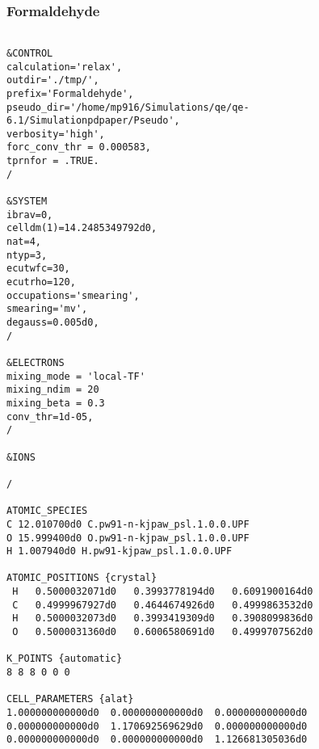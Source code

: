 \subsubsection*{Formaldehyde}
\begin{verbatim}
    
&CONTROL
calculation='relax',
outdir='./tmp/',
prefix='Formaldehyde',
pseudo_dir='/home/mp916/Simulations/qe/qe-6.1/Simulationpdpaper/Pseudo',
verbosity='high',
forc_conv_thr = 0.000583,
tprnfor = .TRUE.
/

&SYSTEM
ibrav=0,
celldm(1)=14.2485349792d0,
nat=4,
ntyp=3,
ecutwfc=30,
ecutrho=120,
occupations='smearing',
smearing='mv',
degauss=0.005d0,
/

&ELECTRONS
mixing_mode = 'local-TF'
mixing_ndim = 20
mixing_beta = 0.3
conv_thr=1d-05,
/

&IONS

/

ATOMIC_SPECIES
C 12.010700d0 C.pw91-n-kjpaw_psl.1.0.0.UPF
O 15.999400d0 O.pw91-n-kjpaw_psl.1.0.0.UPF
H 1.007940d0 H.pw91-kjpaw_psl.1.0.0.UPF

ATOMIC_POSITIONS {crystal}
 H   0.5000032071d0   0.3993778194d0   0.6091900164d0
 C   0.4999967927d0   0.4644674926d0   0.4999863532d0
 H   0.5000032073d0   0.3993419309d0   0.3908099836d0
 O   0.5000031360d0   0.6006580691d0   0.4999707562d0

K_POINTS {automatic}
8 8 8 0 0 0

CELL_PARAMETERS {alat}
1.000000000000d0  0.000000000000d0  0.000000000000d0
0.000000000000d0  1.170692569629d0  0.000000000000d0
0.000000000000d0  0.000000000000d0  1.126681305036d0


\end{verbatim}

